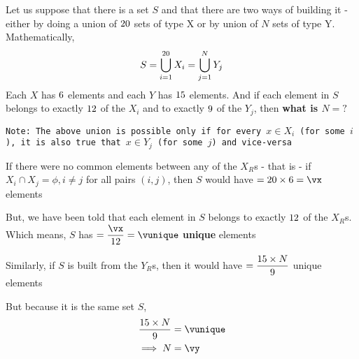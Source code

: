 

\MULTIPLY\va\vc\vx
\DIVIDE\vx\vd\vunique
\MULTIPLY\vunique\ve\a
\DIVIDE\a\vb\vy

\question[5] Let us suppose that there is a set $S$ and that there are two ways of building it - 
either by doing a union of $20$ sets of type X or by union of $N$ sets of type Y.
Mathematically, 
    \[ S = \bigcup_{i=1}^{20} X_i = \bigcup_{j=1}^N Y_j\]
Each $X$ has $6$ elements and each $Y$ has $15$ elements. And if each element in $S$ belongs to 
exactly $12$ of the $X_i$ and to exactly $9$ of the $Y_j$, then \textbf{ what is $N=?$}

\texttt{Note: The above union is possible only if for every $x\in X_i$ (for some $i$), it is also true that $x\in Y_j$ 
(for some $j$) and vice-versa} 

\watchout[-4cm]

\ifprintanswers
\fi 

\begin{solution}[\fullpage]
  If there were no common elements between any of the $X_R$s - that is - 
  if $X_i\cap X_j = \phi,i\neq j$ for all pairs $(i,j)$, then $S$ would have 
  $=\vc\times\va = \vx$ elements

  But, we have been told that each element in $S$ belongs to exactly $12$ of the $X_R$s.
  Which means, $S$ has $ =\dfrac\vx\vd = \vunique$ \textbf{unique} elements

  Similarly, if $S$ is built from the $Y_R$s, then it would have $=\dfrac{15\times N}{9}$ 
  unique elements 

  But because it is the same set $S$, 
  \begin{align}
    \dfrac{\vb\times N}{\ve} &= \vunique \\
    \implies N &= \vy
  \end{align}
\end{solution}

